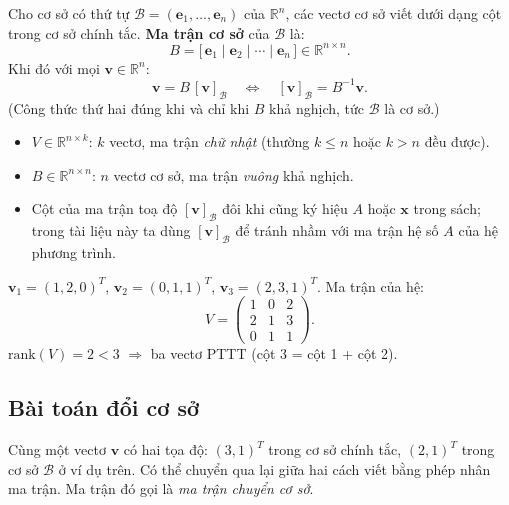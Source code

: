 \documentclass[12pt,a4paper]{article}
\begin{document}
\begin{dinhnghia}[title={Ma trận cơ sở}]
  Cho cơ sở có thứ tự $\mathcal{B} = (\mathbf{e}_1, \ldots, \mathbf{e}_n)$ của $\mathbb{R}^n$, các vectơ cơ sở viết dưới dạng cột trong cơ sở chính tắc. \textbf{Ma trận cơ sở} của $\mathcal{B}$ là:
  \[
    B = \bigl[\, \mathbf{e}_1 \;\big|\; \mathbf{e}_2 \;\big|\; \cdots \;\big|\; \mathbf{e}_n \,\bigr] \in \mathbb{R}^{n \times n}.
  \]
  Khi đó với mọi $\mathbf{v} \in \mathbb{R}^n$:
  \[
    \mathbf{v} = B\,[\mathbf{v}]_{\mathcal{B}}
    \quad\Longleftrightarrow\quad
    [\mathbf{v}]_{\mathcal{B}} = B^{-1}\mathbf{v}.
  \]
  (Công thức thứ hai đúng khi và chỉ khi $B$ khả nghịch, tức $\mathcal{B}$ là cơ sở.)
\end{dinhnghia}

\begin{luuy}[title={Phân biệt ký hiệu}]
\begin{itemize}
  \item $V \in \mathbb{R}^{n \times k}$: $k$ vectơ, ma trận \emph{chữ nhật} (thường $k \le n$ hoặc $k > n$ đều được).
  \item $B \in \mathbb{R}^{n \times n}$: $n$ vectơ cơ sở, ma trận \emph{vuông} khả nghịch.
  \item Cột của ma trận toạ độ $[\mathbf{v}]_{\mathcal{B}}$ đôi khi cũng ký hiệu $A$ hoặc $\mathbf{x}$ trong sách; trong tài liệu này ta dùng $[\mathbf{v}]_{\mathcal{B}}$ để tránh nhầm với ma trận hệ số $A$ của hệ phương trình.
\end{itemize}
\end{luuy}

\begin{vidu}[title={Ma trận của hệ vectơ}]
$\mathbf{v}_1 = (1, 2, 0)^T$, $\mathbf{v}_2 = (0, 1, 1)^T$, $\mathbf{v}_3 = (2, 3, 1)^T$. Ma trận của hệ:
\[
  V = \begin{pmatrix}1 & 0 & 2\\ 2 & 1 & 3\\ 0 & 1 & 1\end{pmatrix}.
\]
$\mathrm{rank}(V) = 2 < 3$ $\Rightarrow$ ba vectơ PTTT (cột 3 = cột 1 + cột 2).
\end{vidu}

\subsection{Bài toán đổi cơ sở}

\begin{dongco}
Cùng một vectơ $\mathbf{v}$ có hai tọa độ: $(3, 1)^T$ trong cơ sở chính tắc, $(2, 1)^T$ trong cơ sở $\mathcal{B}$ ở ví dụ trên. Có thể chuyển qua lại giữa hai cách viết bằng phép nhân ma trận. Ma trận đó gọi là \emph{ma trận chuyển cơ sở}.
\end{dongco}
\end{document}

